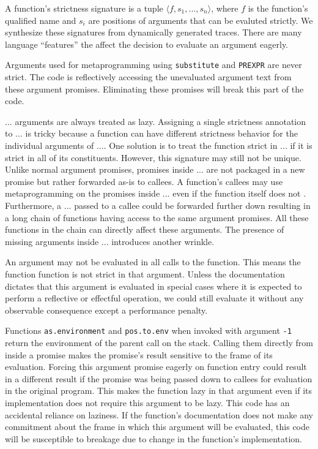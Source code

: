 \documentclass[review,nonacm,screen,acmsmall,anonymous=true]{acmart}
\newcommand{\code}[1]{\lstinline[style=R]|#1|\xspace}
\begin{document}
A function's strictness signature is a tuple $\langle f, s_1, ..., s_n \rangle$,
where $f$ is the function's qualified name and $s_i$ are positions of arguments
that can be evaluted strictly. We synthesize these signatures from dynamically
generated traces. There are many language ``features'' the affect the decision
to evaluate an argument eagerly.

Arguments used for metaprogramming using \code{substitute} and \code{PREXPR} are
never strict. The code is reflectively accessing the unevaluated argument text
from these argument promises. Eliminating these promises will break this part of
the code.

$...$ arguments are always treated as lazy. Assigning a single strictness
annotation to $...$ is tricky because a function can have different strictness
behavior for the individual arguments of $...$. One solution is to treat the
function strict in $...$ if it is strict in all of its constituents. However,
this signature may still not be unique. Unlike normal argument promises,
promises inside $...$ are not packaged in a new promise but rather forwarded
as-is to callees. A function's callees may use metaprogramming on the promises
inside $...$ even if the function itself does not . Furthermore, a $...$ passed
to a callee could be forwarded further down resulting in a long chain of
functions having access to the same argument promises. All these functions in
the chain can directly affect these arguments. The presence of missing arguments
inside $...$ introduces another wrinkle.

An argument may not be evaluated in all calls to the function. This means the
function function is not strict in that argument. Unless the documentation
dictates that this argument is evaluated in special cases where it is expected
to perform a reflective or effectful operation, we could still evaluate it
without any observable consequence except a performance penalty.

Functions \code{as.environment} and \code{pos.to.env} when invoked with argument
\code{-1} return the environment of the parent call on the stack. Calling them
directly from inside a promise makes the promise's result sensitive to the frame
of its evaluation. Forcing this argument promise eagerly on function entry could
result in a different result if the promise was being passed down to callees for
evaluation in the original program. This makes the function lazy in that
argument even if its implementation does not require this argument to be lazy.
This code has an accidental reliance on laziness. If the function's
documentation does not make any commitment about the frame in which this
argument will be evaluated, this code will be susceptible to breakage due to
change in the function's implementation.
\end{document}
